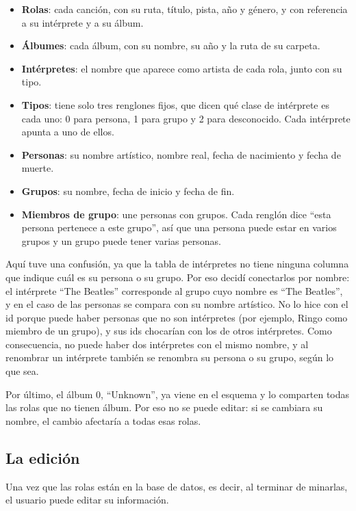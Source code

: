 \documentclass[12pt,letterpaper]{article}
\begin{document}
\begin{itemize}
    \item \textbf{Rolas}: cada canción, con su ruta, título, pista, año y
          género, y con referencia a su intérprete y a su álbum.
    \item \textbf{Álbumes}: cada álbum, con su nombre, su año y la ruta de
          su carpeta.
    \item \textbf{Intérpretes}: el nombre que aparece como artista de cada
          rola, junto con su tipo.
    \item \textbf{Tipos}: tiene solo tres renglones fijos, que dicen qué
          clase de intérprete es cada uno: 0 para persona, 1 para grupo y
          2 para desconocido. Cada intérprete apunta a uno de ellos.
    \item \textbf{Personas}: su nombre artístico, nombre real, fecha de
          nacimiento y fecha de muerte.
    \item \textbf{Grupos}: su nombre, fecha de inicio y fecha de fin.
    \item \textbf{Miembros de grupo}: une personas con grupos. Cada renglón
          dice ``esta persona pertenece a este grupo'', así que una
          persona puede estar en varios grupos y un grupo puede tener
          varias personas.
\end{itemize}

Aquí tuve una confusión, ya que la tabla de intérpretes no tiene ninguna
columna que indique cuál es su persona o su grupo. Por eso decidí
conectarlos por nombre: el intérprete ``The Beatles'' corresponde al grupo
cuyo nombre es ``The Beatles'', y en el caso de las personas se compara
con su nombre artístico. No lo hice con el id porque puede haber personas
que no son intérpretes (por ejemplo, Ringo como miembro de un grupo), y
sus ids chocarían con los de otros intérpretes. Como consecuencia, no
puede haber dos intérpretes con el mismo nombre, y al renombrar un
intérprete también se renombra su persona o su grupo, según lo que sea.

Por último, el álbum 0, ``Unknown'', ya viene en el esquema y lo comparten
todas las rolas que no tienen álbum. Por eso no se puede editar: si se
cambiara su nombre, el cambio afectaría a todas esas rolas.

\subsection{La edición}

Una vez que las rolas están en la base de datos, es decir, al terminar de
minarlas, el usuario puede editar su información.
\end{document}

